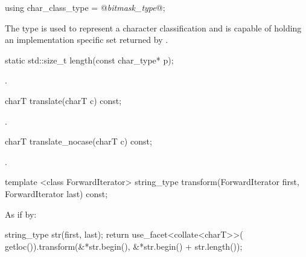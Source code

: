 %
\begin{itemdecl}
using char_class_type = @\textit{bitmask_type}@; 
\end{itemdecl}

\begin{itemdescr}
\pnum
The type  is used to represent a character
classification and is capable of holding an implementation specific
set returned by .
\end{itemdescr}

%
\begin{itemdecl}
static std::size_t length(const char_type* p); 
\end{itemdecl}

\begin{itemdescr}
\pnum\returns {}.
\end{itemdescr}

%
\begin{itemdecl}
charT translate(charT c) const; 
\end{itemdecl}

\begin{itemdescr}
\pnum\returns {}.
\end{itemdescr}

%
\begin{itemdecl}
charT translate_nocase(charT c) const; 
\end{itemdecl}

\begin{itemdescr}
\pnum\returns {}.
\end{itemdescr}

%
\begin{itemdecl}
template <class ForwardIterator>
  string_type transform(ForwardIterator first, ForwardIterator last) const; 
\end{itemdecl}

\begin{itemdescr}
\pnum\effects
As if by:
\begin{codeblock}
string_type str(first, last);
return use_facet<collate<charT>>(
  getloc()).transform(&*str.begin(), &*str.begin() + str.length());
\end{codeblock}
\end{itemdescr}

